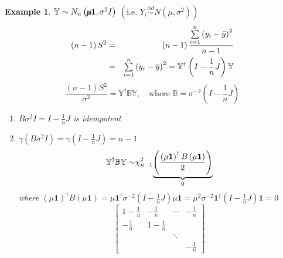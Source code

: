 \documentclass{article}
\newtheorem{example}[theorem]{Example}
\begin{document}
\begin{example}
$\mathbb{Y}\sim N_{n}\left( \mathbb{%
\mu\mkern-12.3mu\mu%
}\boldsymbol{1},\mathbb{\sigma }^{2}I\right) $ $\left( \text{i.e. }Y_{i}%
\overset{iid}{\sim }N\left( \mu ,\sigma ^{2}\right) \right) $%
\begin{eqnarray*}
\left( n-1\right) S^{2} &=&\left( n-1\right) \frac{\tsum\limits_{i=1}^{n}%
\left( y_{i}-\bar{y}\right) ^{2}}{n-1} \\
&=&\tsum\limits_{i=1}^{n}\left( y_{i}-\bar{y}\right) ^{2}=\mathbb{Y}%
^{\dagger }\left( I-\frac{1}{n}J\right) \mathbb{Y}
\end{eqnarray*}%
\begin{equation*}
\frac{\left( n-1\right) S^{2}}{\sigma ^{2}}=\mathbb{Y}^{\dagger }\mathbb{BY}%
,\quad \text{where }\mathbb{B}=\sigma ^{-2}\left( I-\frac{1}{n}J\right) 
\end{equation*}

\begin{enumerate}
\item $B\sigma ^{2}I=I-\frac{1}{n}J$ is idempotent

\item $\gamma \left( B\sigma ^{2}I\right) =\gamma \left( I-\frac{1}{n}%
J\right) =n-1$%
\begin{equation*}
\therefore \mathbb{Y}^{\dagger }\mathbb{BY\sim }\chi _{n-1}^{2}\underset{0}{%
\underbrace{\left( \frac{\left( \mu \boldsymbol{1}\right) ^{\dagger }B\left(
\mu \boldsymbol{1}\right) }{2}\right) }}
\end{equation*}%
where $\left( \mu \boldsymbol{1}\right) ^{\dagger }B\left( \mu \boldsymbol{1}%
\right) =\mu \boldsymbol{1}^{\dagger }\sigma ^{-2}\left( I-\frac{1}{n}%
J\right) \mu \boldsymbol{1}=\mu ^{2}\sigma ^{-2}\boldsymbol{1}^{\dagger
}\left( I-\frac{1}{n}J\right) \boldsymbol{1}=0$%
\begin{equation*}
\left[ 
\begin{array}{cccc}
1-\frac{1}{n} & -\frac{1}{n} & \cdots  & -\frac{1}{n} \\ 
-\frac{1}{n} & 1-\frac{1}{n} &  &  \\ 
&  & \ddots  &  \\ 
&  &  & -\frac{1}{n}%
\end{array}%
\right] 
\end{equation*}
\end{enumerate}
\end{example}
\end{document}
